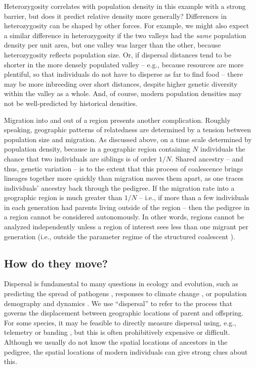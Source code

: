 \documentclass{ar-1col}
\newcommand{\g}[1]{{\color{blue}{#1}}}
\renewcommand{\emph}[1]{{\textit{#1}}}
\begin{document}
Heterozygosity correlates with population density in this example with a strong barrier,
but does it predict relative density more generally?
Differences in heterozygosity can be shaped by other forces.
For example, we might also expect a similar difference in heterozygosity
if the two valleys had the \emph{same} population density per unit area,
but one valley was larger than the other,
because heterozygosity reflects population size.
Or, if dispersal distances tend to be shorter
in the more densely populated valley -- 
e.g., because resources are more plentiful, 
so that individuals do not have to disperse as far to find food -- 
there may be more inbreeding over short distances,
despite higher genetic diversity within the valley as a whole.
And, of course, modern population densities may not be well-predicted by historical densities.

Migration into and out of a region presents another complication.
Roughly speaking,
geographic patterns of relatedness
are determined by a tension between population size and migration.
As discussed above,
\g{genealogical relationships form} on a time scale determined by population density,
because in a geographic region containing $N$ individuals
the chance that two individuals are siblings is of order $1/N$.
Shared ancestry -- and thus, genetic variation -- is \g{spatially autocorrelated}
to the extent that this process of coalescence
brings lineages together more quickly than migration moves them apart,
as one traces individuals' ancestry back through the pedigree.
If the migration rate into a geographic region is much greater than $1/N$ --
i.e., if more than a few individuals in each generation had parents living outside of the region --
then the pedigree in a region cannot be considered autonomously.
In other words,
regions cannot be analyzed independently
unless a region of interest sees less than one migrant per generation
(i.e., outside the parameter regime of the structured coalescent \citep{nagylaki1998}).


\subsection{How do they move?}

Dispersal is fundamental to many questions in ecology and evolution,
such as
predicting the spread of pathogens \citep{BiekReal2010},
responses to climate change \citep{parmesan2006},
or population demography and dynamics \citep{schreiber2010interactive}.
We use \g{the term} ``dispersal'' to refer to the process that governs 
the displacement between geographic locations of parent and offspring.
For some species,
it may be feasible to directly measure dispersal 
using, e.g., telemetry or banding \citep{Cayuela2018demographic},
but this is often prohibitively expensive or difficult.
Although we usually do not know the spatial locations of ancestors in the pedigree,
the spatial locations of modern individuals can give strong clues about this.
\end{document}
